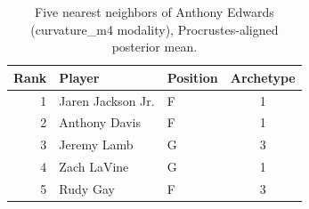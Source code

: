 \begin{table}[htbp]
  \centering\small
  \begin{tabular}{rllc}
    \toprule
    Rank & Player & Position & Archetype \\
    \midrule
    1 & Jaren Jackson Jr. & F & 1 \\
    2 & Anthony Davis & F & 1 \\
    3 & Jeremy Lamb & G & 3 \\
    4 & Zach LaVine & G & 1 \\
    5 & Rudy Gay & F & 3 \\
    \bottomrule
  \end{tabular}
  \caption{Five nearest neighbors of Anthony Edwards (curvature_m4 modality), Procrustes-aligned posterior mean.}
  \label{tab:Anthony_Edwards_neighbors_curvature_m4}
\end{table}

